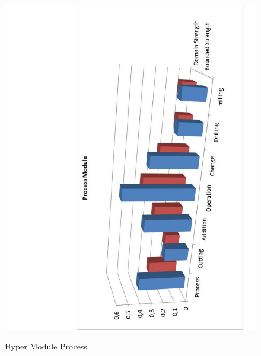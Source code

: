 \begin{figure}
\begin{center}
	\includegraphics[scale=0.5, angle=-90]{figure-chapterIV/fig4-20}\\
	\caption{Hyper Module Process}
	\label{figure4-20}
\end{center}
\end{figure}


